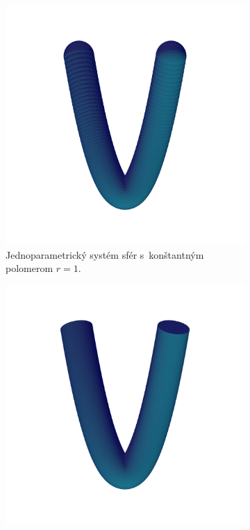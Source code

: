 \begin{figure}[h]
    \centering
    \captionsetup{justification=centering}
    \captionsetup[subfigure]{justification=centering}
    \begin{subfigure}[t]{0.49\textwidth}
        \centering
        \includegraphics[width=\textwidth, trim=0mm 50mm 0mm 80mm, clip=true]{images/bienert_constant_radius_spheres.png}
        	\caption{Jednoparametrický systém sfér s~konštantným polomerom $r=1$.}
        \label{fig:plocha1}
    \end{subfigure}
    \begin{subfigure}[t]{0.49\textwidth}
        \centering
        \includegraphics[width=\textwidth, trim=0mm 50mm 0mm 80mm, clip=true]{images/bienert_constant_radius_envelope.png}

\end{subfigure}
\end{figure}
